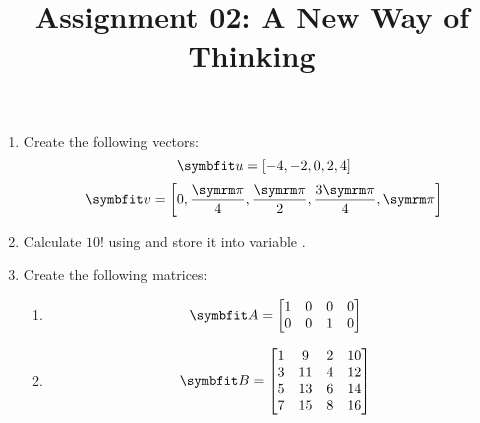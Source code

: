 \documentclass{article}
\title{Assignment 02: A New Way of Thinking}
\begin{document}
\renderTitle

\begin{enumerate}[leftmargin=*]
	\item
		Create the following vectors:
		\begin{equation}
			\mat{u}
			=
			[-4, -2, 0, 2, 4]
		\end{equation}
		\begin{equation}
			\mat{v}
			=
			\left[
				0,
				\frac{\cpi}{4},
				\frac{\cpi}{2},
				\frac{3\cpi}{4},
				\cpi
			\right]
		\end{equation}

	\item
		Calculate \(10!\) using  and
		store it into variable .

	\item
		Create the following matrices:
		\begin{enumerate}
			\item
				\begin{equation}
					\mat{A}
					=
					\begin{bmatrix}
						1 & 0 & 0 & 0 \\
						0 & 0 & 1 & 0 \\
					\end{bmatrix}
				\end{equation}

			\item
				\begin{equation}
					\mat{B}
					=
					\begin{bmatrix}
						1 &  9 & 2 & 10 \\
						3 & 11 & 4 & 12 \\
						5 & 13 & 6 & 14 \\
						7 & 15 & 8 & 16 \\
					\end{bmatrix}
				\end{equation}
		\end{enumerate}
\end{enumerate}
\end{document}
